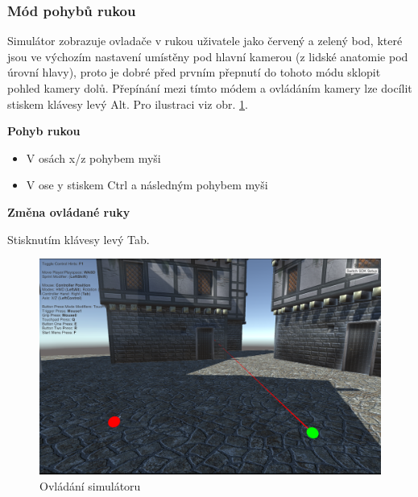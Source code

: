 \documentclass[thesis=B,czech]{FITthesis}[2012/06/26]
\begin{document}
\subsubsection{Mód pohybů rukou}
Simulátor zobrazuje ovladače v rukou uživatele jako červený a zelený bod, které jsou ve výchozím nastavení umístěny pod hlavní kamerou (z lidské anatomie pod úrovní hlavy), proto je dobré před prvním přepnutí do tohoto módu sklopit pohled kamery dolů. Přepínání mezi tímto módem a ovládáním kamery lze docílit stiskem klávesy levý Alt. Pro ilustraci viz obr. \ref{fig:simulator}.

\begin{description}

	\item \textbf{Pohyb rukou}
	
	\begin{itemize}
		\item V osách x/z pohybem myši
		\item V ose y stiskem Ctrl a následným pohybem myši
	\end{itemize}

	\item \textbf{Změna ovládané ruky}
	
	Stisknutím klávesy levý Tab.	

\end{description}

\begin{figure}
  		\includegraphics[width=\textwidth,height=\textheight,keepaspectratio]{screen2.png}
  		\caption{Ovládání simulátoru}
  		\label{fig:simulator}
	\end{figure}
\end{document}
